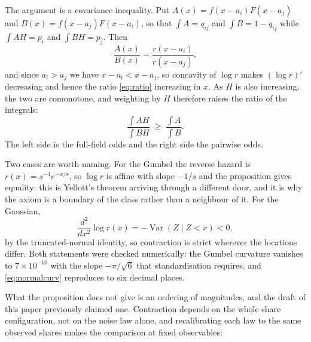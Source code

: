 \documentclass[11pt]{article}
\begin{document}
\medskip
The argument is a covariance inequality. Put $A(x) = f(x - a_i) F(x - a_j)$ and
$B(x) = f(x - a_j) F(x - a_i)$, so that $\int A = q_{ij}$ and $\int B = 1 - q_{ij}$
while $\int A H = p_i$ and $\int B H = p_j$. Then
\begin{equation}
\frac{A(x)}{B(x)} = \frac{r(x - a_i)}{r(x - a_j)},
\label{eq:ratio}
\end{equation}
and since $a_i > a_j$ we have $x - a_i < x - a_j$, so concavity of $\log r$ makes
$(\log r)'$ decreasing and hence the ratio \eqref{eq:ratio} increasing in $x$. As $H$
is also increasing, the two are comonotone, and weighting by $H$ therefore raises
the ratio of the integrals:
\[
\frac{\int A H}{\int B H} \;\ge\; \frac{\int A}{\int B}.
\]
The left side is the full-field odds and the right side the pairwise odds.

Two cases are worth naming. For the Gumbel the reverse hazard is $r(x) = s^{-1}
e^{-x/s}$, so $\log r$ is affine with slope $-1/s$ and the proposition gives
equality: this is Yellott's theorem arriving through a different door, and it is
why the axiom is a boundary of the class rather than a neighbour of it. For the
Gaussian,
\begin{equation}
\frac{d^2}{dx^2} \log r(x) = -\operatorname{Var}(Z \mid Z < x) < 0,
\label{eq:normalcurv}
\end{equation}
by the truncated-normal identity, so contraction is strict wherever the locations
differ. Both statements were checked numerically: the Gumbel curvature vanishes to
$7 \times 10^{-10}$ with the slope $-\pi/\sqrt{6}$ that standardisation requires, and
\eqref{eq:normalcurv} reproduces to six decimal places.

What the proposition does not give is an ordering of magnitudes, and the draft of
this paper previously claimed one. Contraction depends on the whole share
configuration, not on the noise law alone, and recalibrating each law to the same
observed shares makes the comparison at fixed observables:
\end{document}
